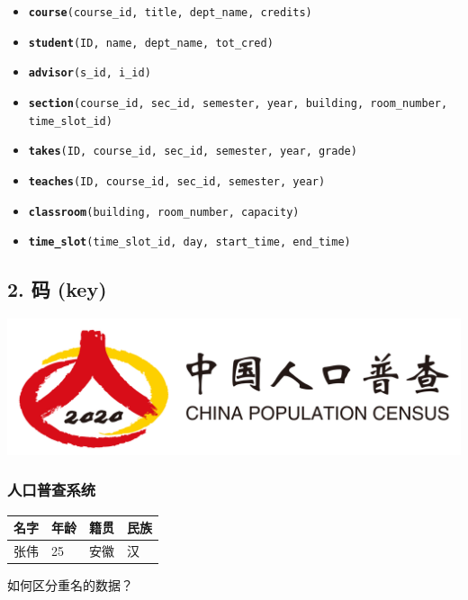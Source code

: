 \documentclass[aspectratio=169, 14pt]{beamer}
\begin{document}
\begin{frame}

	\begin{itemize}
		\item \texttt{\textbf{course}(course\_id, title, dept\_name, credits)}
		\item \texttt{\textbf{student}(ID, name, dept\_name, tot\_cred)}
		\item \texttt{\textbf{advisor}(s\_id, i\_id)}
		\item \texttt{\textbf{section}(course\_id, sec\_id, semester, year, building, room\_number, time\_slot\_id)}
		\item \texttt{\textbf{takes}(ID, course\_id, sec\_id, semester, year, grade)}
		\item \texttt{\textbf{teaches}(ID, course\_id, sec\_id, semester, year)}
		\item \texttt{\textbf{classroom}(building, room\_number, capacity)}
		\item \texttt{\textbf{time\_slot}(time\_slot\_id, day, start\_time, end\_time)}
	\end{itemize}

\end{frame}

\begin{frame}
	\section{\textcolor{darkmidnightblue}{2. 码 (key)}}
	\includegraphics[height=.3\paperheight]{image/census}
\end{frame}

\begin{frame}
	\frametitle{人口普查系统}
	\begin{table}
		\begin{tabular}{llll}
			\toprule
			名字 & 年龄 & 籍贯 & 民族 \\
			\midrule
			张伟 & 25 & 安徽 & 汉  \\
			\bottomrule
		\end{tabular}
	\end{table}
	{\large {}} 如何区分重名的数据？

\end{frame}
\end{document}

